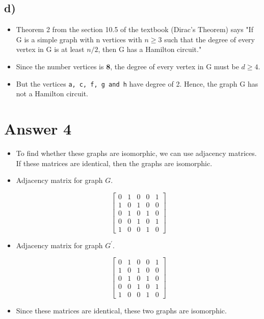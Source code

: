 \documentclass[11pt]{article}
\begin{document}
\subsection*{d)}
    \begin{itemize}
        \item Theorem 2 from the section 10.5 of the textbook (Dirac’s Theorem) says "If G is a simple graph with n vertices with $n \ge 3$ such that the degree of every vertex in G is at least $n/2$, then G has a Hamilton circuit."
        \item Since the number vertices is $\mathbf{8}$, the degree of every vertex in G must be $d \ge 4$.
        \item But the vertices \texttt{a, c, f, g and h} have degree of 2. Hence, the graph G has not a Hamilton circuit.
    \end{itemize}{}
    
\section*{Answer 4}
    \begin{itemize}
        \item To find whether these graphs are isomorphic, we can use adjacency matrices. If these matrices are identical, then the graphs are isomorphic.
        \item Adjacency matrix for graph $G$.
            \begin{figure}[H]
            $$  
                \begin{bmatrix}{}
                    0 & 1 & 0 & 0 & 1 \\
                    1 & 0 & 1 & 0 & 0 \\
                    0 & 1 & 0 & 1 & 0 \\
                    0 & 0 & 1 & 0 & 1 \\
                    1 & 0 & 0 & 1 & 0
                \end{bmatrix}{} 
            $$
            \end{figure}{}
        \item Adjacency matrix for graph $G^{'}$.
            \begin{figure}[H]
            $$  
                \begin{bmatrix}{}
                    0 & 1 & 0 & 0 & 1 \\
                    1 & 0 & 1 & 0 & 0 \\
                    0 & 1 & 0 & 1 & 0 \\
                    0 & 0 & 1 & 0 & 1 \\
                    1 & 0 & 0 & 1 & 0
                \end{bmatrix}{} 
            $$
            \end{figure}{}
        \item Since these matrices are identical, these two graphs are isomorphic.
    \end{itemize}{}
\end{document}
